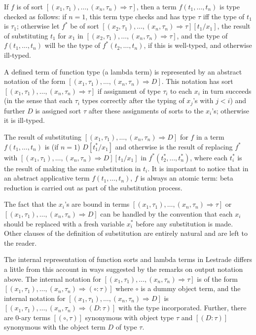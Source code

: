 \documentclass[12pt]{article}
\begin{document}
If $f$ is of sort $[(x_1,\tau_1),\ldots,(x_n,\tau_n) \Rightarrow \tau]$, then a term $f(t_1,\ldots,t_n)$ is type checked as follows: if $n=1$, this term type checks and has type $\tau$ iff the type
of $t_1$ is $\tau_1$;  otherwise let $f^*$ be of sort $[(x_2,\tau_1),\ldots,(x_n,\tau_n) \Rightarrow \tau][t_1/x_1]$, the result of substituting $t_1$ for $x_1$ in $[(x_2,\tau_1),\ldots,(x_n,\tau_n) \Rightarrow \tau]$, and the type of $f(t_1,\ldots,t_n)$ will be the type of $f^*(t_2,\ldots,t_n)$, if this is well-typed, and otherwise ill-typed.

A defined term of function type (a lambda term) is represented by an abstract notation of the form $[(x_1,\tau_1),\ldots,(x_n,\tau_n) \Rightarrow D]$.  This notation has sort $[(x_1,\tau_1),\ldots,(x_n,\tau_n) \Rightarrow \tau]$ if assignment of type $\tau_i$ to each $x_i$ in turn succeeds (in the sense that each $\tau_i$ types correctly after the typing of $x_j$'s with $j<i$) and further $D$ is assigned sort $\tau$ after these assignments of sorts to the $x_i$'s; otherwise it is ill-typed.

The result of substituting $[(x_1,\tau_1),\ldots,(x_n,\tau_n) \Rightarrow D]$ for $f$ in a term $f(t_1,\ldots,t_n)$ is (if $n=1$) $D[t_1^*/x_1]$ and otherwise is the result of replacing
$f^*$ with $[(x_1,\tau_1),\ldots,(x_n,\tau_n) \Rightarrow D][t_1/x_1]$ in $f^*(t_2^*,\ldots,t_n^* )$, where each $t_i^*$ is the result of making the same substitution in $t_i$.  It is important to notice that in an abstract applicative term $f(t_1,\ldots,t_n)$, $f$ is always an atomic term:  beta reduction is carried out as part of the substitution process.

The fact that the $x_i$'s are bound in terms $[(x_1,\tau_1),\ldots,(x_n,\tau_n) \Rightarrow \tau]$ or $[(x_1,\tau_1),\ldots,(x_n,\tau_n) \Rightarrow D]$ can be handled by the convention that each $x_i$ should be replaced with a fresh variable $x_i^*$ before any substitution is made.  Other clauses of the definition of substitution are entirely natural and are left to the reader.

The internal representation of function sorts and lambda terms in Lestrade differs a little from this account in ways suggested by the remarks on output notation above.
The internal notation for $[(x_1,\tau_1),\ldots,(x_n,\tau_n) \Rightarrow \tau]$ is of the form $[(x_1,\tau_1),\ldots,(x_n,\tau_n) \Rightarrow (\circ:\tau)]$  where $\circ$ is a dummy object term,  and the internal notation for $[(x_1,\tau_1),\ldots,(x_n,\tau_n) \Rightarrow D]$ is $[(x_1,\tau_1),\ldots,(x_n,\tau_n) \Rightarrow (D:\tau)]$ with the type incorporated.
Further, there are 0-ary terms $[(\circ,\tau)]$ synonymous with object type $\tau$ and $[(D:\tau)]$ synonymous with the object term $D$ of type $\tau$.
\end{document}

